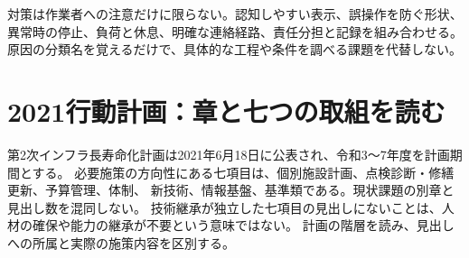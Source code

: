 対策は作業者への注意だけに限らない。認知しやすい表示、誤操作を防ぐ形状、
異常時の停止、負荷と休息、明確な連絡経路、責任分担と記録を組み合わせる。
原因の分類名を覚えるだけで、具体的な工程や条件を調べる課題を代替しない。

\section{2021行動計画：章と七つの取組を読む}
\label{theory:safety:maintenance2021}
第2次インフラ長寿命化計画は2021年6月18日に公表され、令和3〜7年度を計画期間とする。
必要施策の方向性にある七項目は、個別施設計画、点検診断・修繕更新、予算管理、体制、
新技術、情報基盤、基準類である。現状課題の別章と見出し数を混同しない。\cite{saf53_infra2021}
技術継承が独立した七項目の見出しにないことは、人材の確保や能力の継承が不要という意味ではない。
計画の階層を読み、見出しへの所属と実際の施策内容を区別する。
